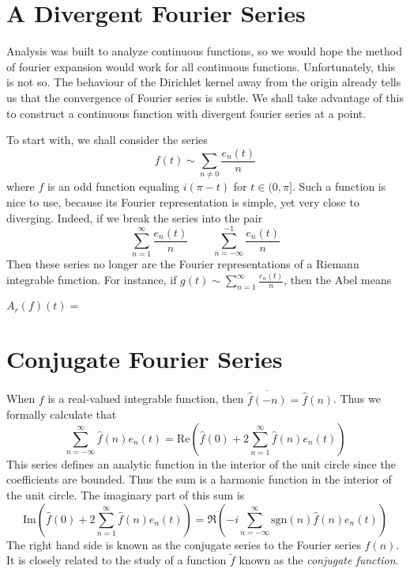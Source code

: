 \section{A Divergent Fourier Series}

Analysis was built to analyze continuous functions, so we would hope the method of fourier expansion would work for all continuous functions. Unfortunately, this is not so. The behaviour of the Dirichlet kernel away from the origin already tells us that the convergence of Fourier series is subtle. We shall take advantage of this to construct a continuous function with divergent fourier series at a point.

To start with, we shall consider the series
%
\[ f(t) \sim \sum_{n \neq 0} \frac{e_n(t)}{n} \]
%
where $f$ is an odd function equaling $i(\pi - t)$ for $t \in (0,\pi]$. Such a function is nice to use, because its Fourier representation is simple, yet very close to diverging. Indeed, if we break the series into the pair
%
\[ \sum_{n = 1}^\infty  \frac{e_n(t)}{n}\ \ \ \ \ \ \ \ \ \ \sum_{n = -\infty}^{-1} \frac{e_n(t)}{n} \]
%
Then these series no longer are the Fourier representations of a Riemann integrable function. For instance, if $g(t) \sim \sum_{n = 1}^\infty \frac{e_n(t)}{n}$, then the Abel means

$A_r(f)(t) = $

\section{Conjugate Fourier Series}

When $f$ is a real-valued integrable function, then $\overline{\widehat{f}(-n)} = \widehat{f}(n)$. Thus we formally calculate that
%
\[ \sum_{n = -\infty}^\infty \widehat{f}(n) e_n(t) = \text{Re} \left( \widehat{f}(0) + 2\sum_{n = 1}^\infty \widehat{f}(n) e_n(t) \right) \]
%
This series defines an analytic function in the interior of the unit circle since the coefficients are bounded. Thus the sum is a harmonic function in the interior of the unit circle. The imaginary part of this sum is
%
\[ \text{Im} \left( \widehat{f}(0) + 2\sum_{n = 1}^\infty \widehat{f}(n) e_n(t) \right) = \Re \left( -i \sum_{n = -\infty}^\infty \text{sgn}(n) \widehat{f}(n) e_n(t) \right) \]
%
The right hand side is known as the conjugate series to the Fourier series $\widehat{f}(n)$. It is closely related to the study of a function $\tilde{f}$ known as the {\it conjugate function}.





